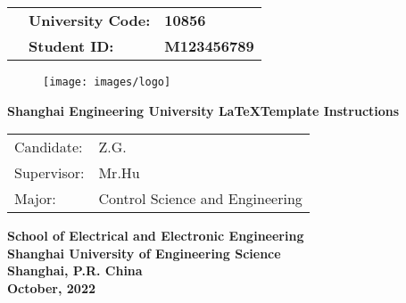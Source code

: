
\begin{center}
    \begin{table}[hbpt]
        \songti\sihao
        \centering
        \renewcommand\arraystretch{1.2}
        \begin{tabular}{p{7.2cm}<{\raggedright}p{4cm}<{\raggedleft}p{2.5cm}<{\centering}}
                    & \textbf{University Code: }&\textbf{10856} \\
                    & \textbf{Student ID: } &\textbf{M123456789}  
        \end{tabular}
    \end{table}
    \begin{figure}[hbpt]
        \centering
        \texttt{[image: images/logo]}\\ [5mm]
    \end{figure}
    \vspace{2cm}
    {\songti\erhao\bfseries Shanghai Engineering University \LaTeX Template Instructions} \\
    \vspace{4cm}
    \begin{table}[hbpt]
        \centering
        \renewcommand\arraystretch{1.2}
        \sanhao \bfseries
        \begin{tabular}{p{4cm}<{\centering}p{6cm}<{\centering}}
            Candidate: & Z.G.\\
            Supervisor: & Mr.Hu \\
            Major: & Control Science and Engineering 
        \end{tabular}
    \end{table}
    \vspace{2cm}
    \begin{center}
        \sanhao \bfseries{School of Electrical and Electronic Engineering}\\
        \sanhao \bfseries{Shanghai University of Engineering Science}\\
        \sanhao \bfseries{Shanghai, P.R. China}\\
        \sanhao \bfseries{October, 2022}
    \end{center}

\end{center}